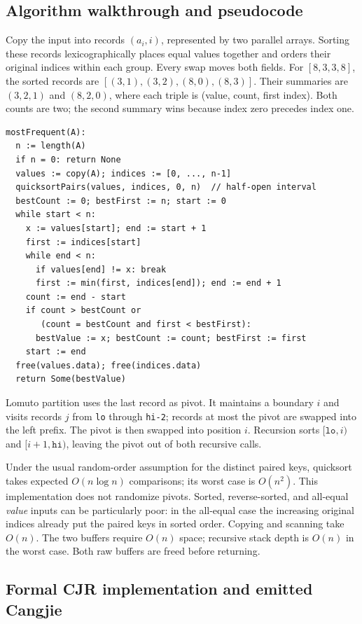 \subsection{Algorithm walkthrough and pseudocode}

Copy the input into records $(a_i,i)$, represented by two parallel arrays.
Sorting these records lexicographically places equal values together and
orders their original indices within each group. Every swap moves both
fields. For $[8,3,3,8]$, the sorted records are
$[(3,1),(3,2),(8,0),(8,3)]$. Their summaries are $(3,2,1)$ and $(8,2,0)$,
where each triple is (value, count, first index). Both counts are two; the
second summary wins because index zero precedes index one.

\begin{lstlisting}
mostFrequent(A):
  n := length(A)
  if n = 0: return None
  values := copy(A); indices := [0, ..., n-1]
  quicksortPairs(values, indices, 0, n)  // half-open interval
  bestCount := 0; bestFirst := n; start := 0
  while start < n:
    x := values[start]; end := start + 1
    first := indices[start]
    while end < n:
      if values[end] != x: break
      first := min(first, indices[end]); end := end + 1
    count := end - start
    if count > bestCount or
       (count = bestCount and first < bestFirst):
      bestValue := x; bestCount := count; bestFirst := first
    start := end
  free(values.data); free(indices.data)
  return Some(bestValue)
\end{lstlisting}
Lomuto partition uses the last record as pivot. It maintains a boundary
$i$ and visits records $j$ from \texttt{lo} through \texttt{hi-2}; records
at most the pivot are swapped into the left prefix. The pivot is then
swapped into position $i$. Recursion sorts $[\texttt{lo},i)$ and
$[i+1,\texttt{hi})$, leaving the pivot out of both recursive calls.

Under the usual random-order assumption for the distinct paired keys,
quicksort takes expected $O(n\log n)$ comparisons; its worst case is
$O(n^2)$. This implementation does not randomize pivots. Sorted,
reverse-sorted, and all-equal \emph{value} inputs can be particularly poor:
in the all-equal case the increasing original indices already put the
paired keys in sorted order. Copying and scanning take $O(n)$. The two
buffers require $O(n)$ space; recursive stack depth is $O(n)$ in the worst
case. Both raw buffers are freed before returning.

\subsection{Formal CJR implementation and emitted Cangjie}

